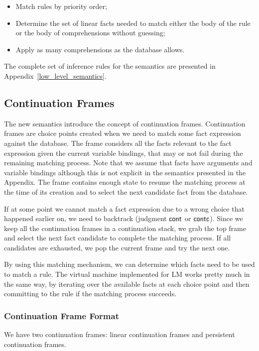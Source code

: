 \begin{itemize}
   \item Match rules by priority order;
   \item Determine the set of linear facts needed to match either the body of the rule or the body of comprehensions without guessing;
   \item Apply as many comprehensions as the database allows.
\end{itemize}

The complete set of inference rules for the semantics are presented in Appendix~\ref{low_level_semantics}.

\subsection{Continuation Frames}

The new semantics introduce the concept of continuation frames. Continuation frames are choice points
created when we need to match some fact expression against the database. The frame considers all the facts
relevant to the fact expression given the current variable bindings, that may or not fail during the remaining matching process. Note that we assume
that facts have arguments and variable bindings although this is not explicit in the semantics
presented in the Appendix.
The frame contains enough state to resume the matching process at the time of its creation and
to select the next candidate fact from the database.

If at some point we cannot match a fact expression due to a wrong choice that happened earlier on,
we need to backtrack (judgment $\mathsf{cont}$ or $\mathsf{contc}$). Since we keep all the continuation frames in a continuation stack,
we grab the top frame and select the next fact candidate to complete the matching process.
If all candidates are exhausted, we pop the current frame and try the next one.

By using this matching mechanism, we can determine which facts need to be used to match a rule.
The virtual machine implemented for LM works pretty much in the same way, by iterating over
the available facts at each choice point and then committing to the rule if the matching process
succeeds.

\subsubsection{Continuation Frame Format}

We have two continuation frames: linear continuation frames and persistent continuation frames.

